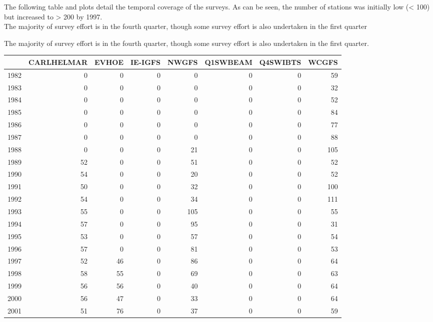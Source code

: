 \documentclass[12pt]{article}\usepackage[]{graphicx}\usepackage[]{color}
\newenvironment{knitrout}{}{} %
\begin{document}
The following table and plots detail the temporal coverage of the surveys. As
can be seen, the number of stations was initially low (< 100) but increased to
> 200 by 1997.\\

The majority of survey effort is in the fourth quarter, though some survey
effort is also undertaken in the first quarter

The majority of survey effort is in the fourth quarter, though some survey
effort is also undertaken in the first quarter. \\ 

\begin{knitrout}\footnotesize
{}\color{fgcolor}
\begin{tabular}{l|r|r|r|r|r|r|r}
\hline
  & CARLHELMAR & EVHOE & IE-IGFS & NWGFS & Q1SWBEAM & Q4SWIBTS & WCGFS\\
\hline
1982 & 0 & 0 & 0 & 0 & 0 & 0 & 59\\
\hline
1983 & 0 & 0 & 0 & 0 & 0 & 0 & 32\\
\hline
1984 & 0 & 0 & 0 & 0 & 0 & 0 & 52\\
\hline
1985 & 0 & 0 & 0 & 0 & 0 & 0 & 84\\
\hline
1986 & 0 & 0 & 0 & 0 & 0 & 0 & 77\\
\hline
1987 & 0 & 0 & 0 & 0 & 0 & 0 & 88\\
\hline
1988 & 0 & 0 & 0 & 21 & 0 & 0 & 105\\
\hline
1989 & 52 & 0 & 0 & 51 & 0 & 0 & 52\\
\hline
1990 & 54 & 0 & 0 & 20 & 0 & 0 & 52\\
\hline
1991 & 50 & 0 & 0 & 32 & 0 & 0 & 100\\
\hline
1992 & 54 & 0 & 0 & 34 & 0 & 0 & 111\\
\hline
1993 & 55 & 0 & 0 & 105 & 0 & 0 & 55\\
\hline
1994 & 57 & 0 & 0 & 95 & 0 & 0 & 31\\
\hline
1995 & 53 & 0 & 0 & 57 & 0 & 0 & 54\\
\hline
1996 & 57 & 0 & 0 & 81 & 0 & 0 & 53\\
\hline
1997 & 52 & 46 & 0 & 86 & 0 & 0 & 64\\
\hline
1998 & 58 & 55 & 0 & 69 & 0 & 0 & 63\\
\hline
1999 & 56 & 56 & 0 & 40 & 0 & 0 & 64\\
\hline
2000 & 56 & 47 & 0 & 33 & 0 & 0 & 64\\
\hline
2001 & 51 & 76 & 0 & 37 & 0 & 0 & 59\\

\end{tabular}
\end{knitrout}
\end{document}
